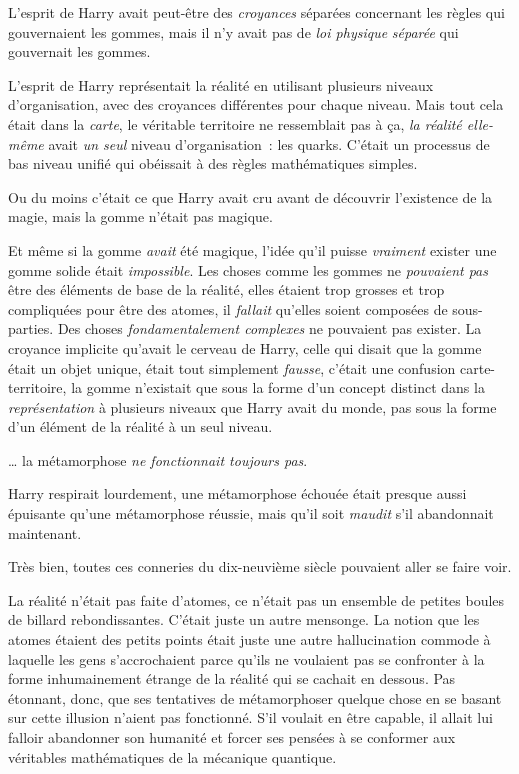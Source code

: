 L'esprit de Harry avait peut-être des \emph{croyances} séparées concernant les règles qui gouvernaient les gommes, mais il n'y avait pas de \emph{loi physique} \emph{séparée} qui gouvernait les gommes.

L'esprit de Harry représentait la réalité en utilisant plusieurs niveaux d'organisation, avec des croyances différentes pour chaque niveau.
Mais tout cela était dans la \emph{carte}, le véritable territoire ne ressemblait pas à ça, \emph{la réalité elle-même} avait \emph{un seul} niveau d'organisation~: les quarks.
C'était un processus de bas niveau unifié qui obéissait à des règles mathématiques simples.

Ou du moins c'était ce que Harry avait cru avant de découvrir l'existence de la magie, mais la gomme n'était pas magique.

Et même si la gomme \emph{avait} été magique, l'idée qu'il puisse \emph{vraiment} exister une gomme solide était \emph{impossible}.
Les choses comme les gommes ne \emph{pouvaient pas} être des éléments de base de la réalité, elles étaient trop grosses et trop compliquées pour être des atomes, il \emph{fallait} qu'elles soient composées de sous-parties.
Des choses \emph{fondamentalement complexes} ne pouvaient pas exister.
La croyance implicite qu'avait le cerveau de Harry, celle qui disait que la gomme était un objet unique, était tout simplement \emph{fausse}, c'était une confusion carte-territoire, la gomme n'existait que sous la forme d'un concept distinct dans la \emph{représentation} à plusieurs niveaux que Harry avait du monde, pas sous la forme d'un élément de la réalité à un seul niveau.

… la métamorphose \emph{ne fonctionnait toujours pas}.

Harry respirait lourdement, une métamorphose échouée était presque aussi épuisante qu'une métamorphose réussie, mais qu'il soit \emph{maudit} s'il abandonnait maintenant.

Très bien, toutes ces conneries du dix-neuvième siècle pouvaient aller se faire voir.

La réalité n'était pas faite d'atomes, ce n'était pas un ensemble de petites boules de billard rebondissantes.
C'était juste un autre mensonge.
La notion que les atomes étaient des petits points était juste une autre hallucination commode à laquelle les gens s'accrochaient parce qu'ils ne voulaient pas se confronter à la forme inhumainement étrange de la réalité qui se cachait en dessous.
Pas étonnant, donc, que ses tentatives de métamorphoser quelque chose en se basant sur cette illusion n'aient pas fonctionné.
S'il voulait en être capable, il allait lui falloir abandonner son humanité et forcer ses pensées à se conformer aux véritables mathématiques de la mécanique quantique.

